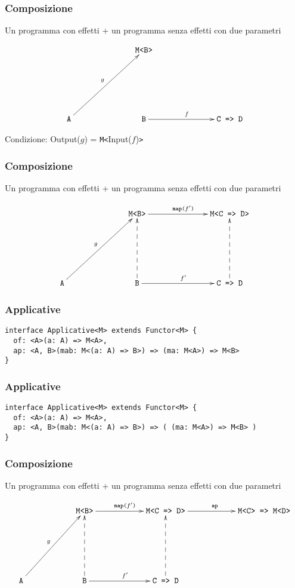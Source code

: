 \documentclass{beamer}
\begin{document}
\begin{frame}
\frametitle{Composizione}

Un programma con effetti + un programma senza effetti con due parametri

\[
\xymatrixrowsep{2.5cm}
\xymatrixcolsep{2.5cm}
\xymatrix{
  & \texttt{M<B>} \\
  \texttt{A} \ar[ur]^{g} & \texttt{B} \ar[r]^{f} & \texttt{C => D}
}
\]

Condizione: Output($g$) = \texttt{M<}Input($f$)\texttt{>}

\end{frame}

\begin{frame}
\frametitle{Composizione}

Un programma con effetti + un programma senza effetti con due parametri

\[
\xymatrixrowsep{2.5cm}
\xymatrixcolsep{2.5cm}
\xymatrix{
  & \texttt{M<B>} \ar[r]^{\texttt{map(}f'\texttt{)}} & \texttt{M<C => D>} \\
  \texttt{A} \ar[ur]^{g} & \texttt{B} \ar[r]^{f'} \ar@{-->}[u] & \texttt{C => D} \ar@{-->}[u]
}
\]

\end{frame}

\begin{frame}[fragile]
\frametitle{Applicative}

\begin{verbatim}
interface Applicative<M> extends Functor<M> {
  of: <A>(a: A) => M<A>,
  ap: <A, B>(mab: M<(a: A) => B>) => (ma: M<A>) => M<B>
}
\end{verbatim}

\end{frame}

\begin{frame}[fragile]
\frametitle{Applicative}

\begin{verbatim}
interface Applicative<M> extends Functor<M> {
  of: <A>(a: A) => M<A>,
  ap: <A, B>(mab: M<(a: A) => B>) => ( (ma: M<A>) => M<B> )
}
\end{verbatim}

\end{frame}

\begin{frame}
\frametitle{Composizione}

Un programma con effetti + un programma senza effetti con due parametri

\[
\xymatrixrowsep{2.5cm}
\xymatrixcolsep{2cm}
\xymatrix{
  & \texttt{M<B>} \ar[r]^{\texttt{map(}f'\texttt{)}} & \texttt{M<C => D>} \ar[r]^{\texttt{ap}} & \texttt{M<C> => M<D>} \\
  \texttt{A} \ar[ur]^{g} & \texttt{B} \ar[r]^{f'} \ar@{-->}[u] & \texttt{C => D} \ar@{-->}[u]
}
\]

\end{frame}
\end{document}
